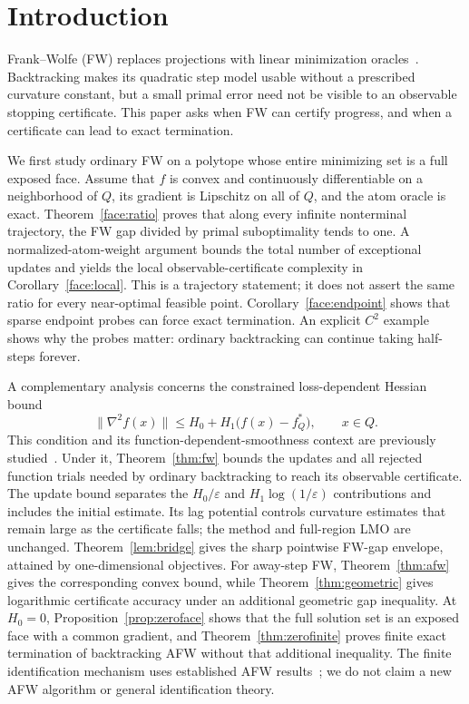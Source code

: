 ﻿\section{Introduction}
Frank--Wolfe (FW) replaces projections with linear minimization oracles~\cite{braun}.
Backtracking makes its quadratic step model usable without a prescribed
curvature constant, but a small primal error need not be visible to an
observable stopping certificate. This paper asks when FW can certify
progress, and when a certificate can lead to exact termination.

We first study ordinary FW on a polytope whose entire minimizing set is
a full exposed face. Assume that $f$ is convex and continuously
differentiable on a neighborhood of $Q$, its gradient is Lipschitz on
all of $Q$, and the atom oracle is exact. Theorem~\ref{face:ratio}
proves that along every infinite nonterminal trajectory, the FW gap
divided by primal suboptimality tends to one. A normalized-atom-weight
argument bounds the total number of exceptional updates and yields the
local observable-certificate complexity in Corollary~\ref{face:local}.
This is a trajectory statement; it does not assert the same ratio for
every near-optimal feasible point. Corollary~\ref{face:endpoint} shows
that sparse endpoint probes can force exact termination. An explicit
$C^2$ example shows why the probes matter: ordinary backtracking can
continue taking half-steps forever.

A complementary analysis concerns the constrained
loss-dependent Hessian bound
\[
 \|\nabla^2 f(x)\|\le H_0+H_1\bigl(f(x)-f_Q^*\bigr),
 \qquad x\in Q.
\]
This condition and its function-dependent-smoothness context are
previously studied~\cite{warmup,liuwarmup,kale,caoselfbound,lobanov}. Under it,
Theorem~\ref{thm:fw} bounds the updates and all rejected function trials
needed by ordinary backtracking to reach its observable certificate. The
update bound separates the $H_0/\varepsilon$ and
$H_1\log(1/\varepsilon)$ contributions and includes the initial
estimate. Its lag potential controls curvature estimates that remain
large as the certificate falls; the method and full-region LMO are
unchanged. Theorem~\ref{lem:bridge} gives the sharp pointwise FW-gap
envelope, attained by one-dimensional objectives. For away-step FW,
Theorem~\ref{thm:afw} gives the corresponding convex bound, while
Theorem~\ref{thm:geometric} gives logarithmic certificate accuracy under
an additional geometric gap inequality. At $H_0=0$,
Proposition~\ref{prop:zeroface} shows that the full solution set is an
exposed face with a common gradient, and Theorem~\ref{thm:zerofinite}
proves finite exact termination of backtracking AFW without that
additional inequality. The finite identification mechanism uses
established AFW results~\cite{bomze,garber}; we do not claim a new AFW
algorithm or general identification theory.

